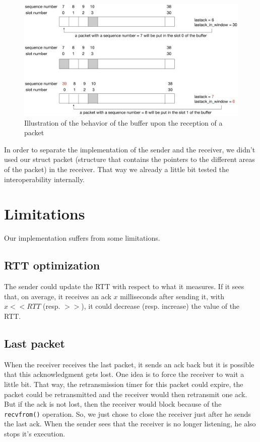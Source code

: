 \documentclass[11pt,a4paper]{article}
\begin{document}
\begin{figure}[!h]
	\begin{center}
		\includegraphics[width=15cm]{images/buffer.eps}
		\caption{Illustration of the behavior of the buffer upon the reception of a packet}
		\label{buffer}
	\end{center}
\end{figure}

In order to separate the implementation of the sender and the receiver, we didn't used our struct packet (structure that contains the pointers to the different areas of the packet) in the receiver. That way we already a little bit tested the interoperability internally.

\section{Limitations}

Our implementation suffers from some limitations.

\subsection{RTT optimization} The sender could update the RTT with respect to what it measures. If it sees that, on average, it receives an ack $x$ milliseconds after sending it, with $x << RTT$ (resp. $>>$), it could decrease (resp. increase) the value of the RTT. 

\subsection{Last packet}
When the receiver receives the last packet, it sends an ack back but it is possible that this acknowledgment gets lost. One idea is to force the receiver to wait a little bit. That way, the retransmission timer for this packet could expire, the packet could be retransmitted and the receiver would then retransmit one ack. But if the ack is not lost, then the receiver would block because of the \texttt{recvfrom()} operation. So, we just chose to close the receiver just after he sends the last ack. When the sender sees that the receiver is no longer listening, he also stops it's execution.
\end{document}
